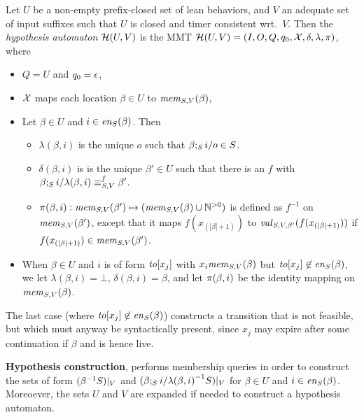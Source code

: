 \begin{definition}
\label{def:hypo}
  Let $U$ be a non-empty prefix-closed set of lean behaviors,
  and $V$ an adequate set of input suffixes such that
  $U$ is closed and timer consistent wrt.\ $V$. Then the
{\em hypothesis automaton} $\hypoof UV$ is the MMT
$\hypoof UV = (I, O, Q, q_0, \vars, \delta, \lambda, \remap)$, where
\begin{itemize}
\item $Q = U$ and $q_0 = \emptyword$,
\item $\vars$ maps each location $\beta\in U$ to $\apprgetmemorable{S}{\beta}{V}$,
\item Let $\beta \in U$ and $i \in \feasibleinputs{\beta}{S}$. Then
  \begin{itemize}
    \item $\lambda(\beta,i)$ is
     the unique $o$ such that $\extend{\beta}{i}{o} \in S$. 
    \item $\delta(\beta,i)$ is is
        the unique $\beta' \in U$ such that there is an $f$ with
  $\extend{\beta}{i}{\lambda(\beta,i)} \equiv_{S,V}^f \beta'$.
      \item $\remap(\beta,i):\apprgetmemorable{S}{\beta'}{V} \mapsto (\apprgetmemorable{S}{\beta}{V} \cup \natplus)$ is defined as $f^{-1}$ on
        $\apprgetmemorable{S}{\beta'}{V}$, except that it maps
        $f(x_{(|\beta|+1)})$ to
        $\apprgetassignment{S}{\beta'}{V}(f(x_{(|\beta|+1)}))$
        if $f(x_{(|\beta|+1)}) \in \apprgetmemorable{S}{\beta'}{V}$.
  \end{itemize}
\item When $\beta \in U$ and $i$ is of form $\toevent{x_j}$ with
  $x_i \apprgetmemorable{S}{\beta}{V}$ but
  $\toevent{x_j} \not\in\feasibleinputs{\beta}{S}$, we let
  $\lambda(\beta,i) = \bot$, 
  $\delta(\beta,i) = \beta$, and let
  $\remap(\beta,i)$ be the identity mapping on $\apprgetmemorable{S}{\beta}{V}$.
\end{itemize}
\end{definition}
The last case (where  $\toevent{x_j} \not\in\feasibleinputs{\beta}{S}$)
constructs a transition that is not feasible,
but which must anyway be syntactically present, since $x_j$
may expire after some continuation if $\beta$ and is hence live.

{\bf Hypothesis construction}, performs membership queries in order
 to construct the sets of form $\apprsuffixbehs{S}{\beta}{V}$ and
 $\apprsuffixbehs{S}{\extend{\beta}{i}{\lambda(\beta,i)}}{V}$
 for $\beta \in U$ and $i \in \feasibleinputs{\beta}{S}$.
 Moreoever, the sets $U$ and $V$ are expanded if needed to construct
 a hypothesis automaton.

